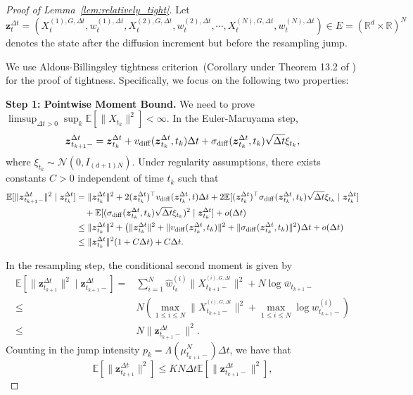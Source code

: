 \documentclass{article}
\newcommand{\mathbbm}[1]{\boldsymbol{#1}}
\theoremstyle{plain}
\theoremstyle{definition}
\theoremstyle{remark}
\newcommand{\E}{\mathbb{E}}
\newcommand{\R}{{\mathbb{R}}}
\begin{document}
\begin{proof}[Proof of Lemma~\ref{lem:relatively_tight}]

    Let \[
        \mathbbm{z}^{\Delta t}_t=(X^{(1),G,\Delta t}_t,w_t^{(1),\Delta t},X^{(2),G,\Delta t}_t,w_t^{(2),\Delta t},\cdots, X^{(N),G,\Delta t}_t,w_t^{(N),\Delta t}) \in E = (\R^d \times \R)^N
    \] 
    denotes the state after the diffusion increment but before the resampling jump.

    We use Aldous-Billingsley tightness criterion~(Corollary under Theorem 13.2 of \cite{billingsley1999convergence}) for the proof of tightness. Specifically, we focus on the following two properties:
    
    \textbf{Step 1: Pointwise Moment Bound.} We need to prove \(\limsup_{\Delta t>0}\sup_{k} \mathbb{E}[\|X_{t_k}\|^2] < \infty\). In the Euler-Maruyama step, 
    \[
        \mathbbm{z}^{\Delta t}_{t_{k+1}-}=\mathbbm{z}^{\Delta t}_{t_k}+v_{\rm diff}(\mathbbm{z}^{\Delta t}_{t_k},t_k)\Delta t+\sigma_{\rm diff}(\mathbbm{z}^{\Delta t}_{t_k},t_k)\sqrt{\Delta t}\xi_{t_k},
    \] where \(\xi_{t_k}\sim \mathcal{N}(0,I_{(d+1)N})\). Under regularity assumptions, there exists constants \(C>0\) independent of time \(t_k\) such that
    \begin{align*}
    \mathbb{E}[\|\mathbbm{z}^{\Delta t}_{t_{k+1}-}\|^2 \mid \mathbbm{z}^{\Delta t}_{t_k}] &= \|\mathbbm{z}^{\Delta t}_{t_k}\|^2 + 2(\mathbbm{z}^{\Delta t}_{t_k})^\top v_{\rm diff}(\mathbbm{z}^{\Delta t}_{t_k},t)\Delta t + 2\mathbb{E}[(\mathbbm{z}^{\Delta t}_{t_k})^\top\sigma_{\rm diff}(\mathbbm{z}^{\Delta t}_{t_k},t_k)\sqrt{\Delta t}\xi_{t_k}\mid \mathbbm{z}^{\Delta t}_{t_k}]\\
    &\quad + \E[(\sigma_{\rm diff}(\mathbbm{z}^{\Delta t}_{t_k},t_k)\sqrt{\Delta t}\xi_{t_k})^2 \mid \mathbbm{z}^{\Delta t}_{t_k}] + o(\Delta t) \\
    &\le \|\mathbbm{z}^{\Delta t}_{t_k}\|^2 + \big(\|\mathbbm{z}^{\Delta t}_{t_k}\|^2+\|v_{\rm diff}(\mathbbm{z}^{\Delta t}_{t_k},t_k)\|^2 + \|\sigma_{\rm diff}(\mathbbm{z}^{\Delta t}_{t_k},t_k)\|^2\big)\Delta t + o(\Delta t)\\
    &\le \|\mathbbm{z}^{\Delta t}_{t_k}\|^2 (1 + C \Delta t) + C \Delta t.
    \end{align*}
    
    In the resampling step, the conditional second moment is given by
    \[
    \begin{aligned}
        \mathbb{E}[\|\mathbbm{z}^{\Delta t}_{t_{k+1}}\|^2 \mid \mathbbm{z}^{\Delta t}_{t_{k+1}-}] =& \sum_{i=1}^N \widehat{w}_{t_k}^{(i)} \|{X}_{t_{k+1}-}^{^{(i),G,\Delta t}}\|^2+N\log \overline{w}_{t_{k+1}-}\\
        \leq& N \left(\max_{1\leq i\leq N}\|{X}_{t_{k+1}-}^{^{(i),G,\Delta t}}\|^2+\max_{1\leq i\leq N}\log w_{t_{k+1}-}^{(i)}\right)\\
        \leq& N\|\mathbbm{z}^{\Delta t}_{t_{k+1}-}\|^2.
    \end{aligned}
    \]
    Counting in the jump intensity \(p_{k} = \Lambda(\mu_{t_{k+1}-}^N)\Delta t\), we have that \[
        \mathbb{E}[\|\mathbbm{z}^{\Delta t}_{t_{k+1}}\|^2] \le KN \Delta t\E[\|\mathbbm{z}^{\Delta t}_{t_{k+1}-}\|^2],
    \]
    

\end{proof}
\end{document}

